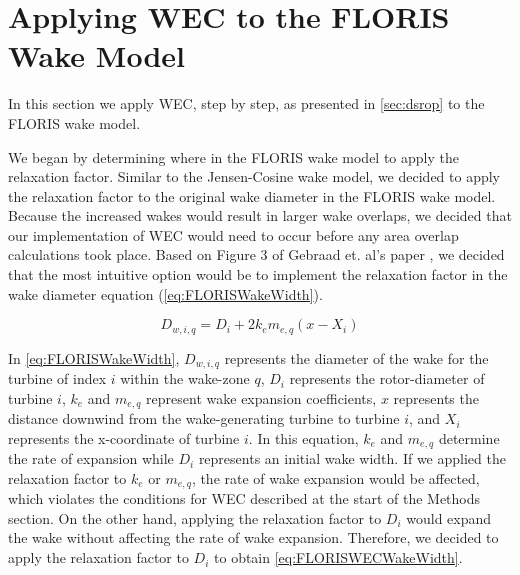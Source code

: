 \documentclass[a4paper]{jpconf}
\begin{document}
\section{Applying WEC to the FLORIS Wake Model}
In this section we apply WEC, step by step, as presented in \cref{sec:dsrop} to the FLORIS wake model.  


We began by determining where in the FLORIS wake model to apply the relaxation factor. Similar to the Jensen-Cosine wake model, we decided to apply the relaxation factor to the original wake diameter in the FLORIS wake model. Because the increased wakes would result in larger wake overlaps, we decided that our implementation of WEC would need to occur before any area overlap calculations took place. Based on Figure 3 of Gebraad et. al's paper \cite{Gebraad2014}, we decided that the most intuitive option would be to implement the relaxation factor in the wake diameter equation (\cref{eq:FLORISWakeWidth}).

\begin{equation}
    D_{w,i,q} = D_i + 2k_em_{e,q}(x - X_i)
    \label{eq:FLORISWakeWidth}
\end{equation}

In \cref{eq:FLORISWakeWidth}, $D_{w,i,q}$ represents the diameter of the wake for the turbine of index $i$ within the wake-zone $q$, $D_i$ represents the rotor-diameter of turbine $i$, $k_e$ and $m_{e,q}$ represent wake expansion coefficients, $x$ represents the distance downwind from the wake-generating turbine to turbine $i$, and $X_i$ represents the x-coordinate of turbine $i$. In this equation, $k_e$ and $m_{e,q}$ determine the rate of expansion while $D_i$ represents an initial wake width. If we applied the relaxation factor to $k_e$ or $m_{e,q}$, the rate of wake expansion would be affected, which violates the conditions for WEC described at the start of the Methods section. On the other hand, applying the relaxation factor to $D_i$ would expand the wake without affecting the rate of wake expansion. Therefore, we decided to apply the relaxation factor to $D_i$ to obtain \cref{eq:FLORISWECWakeWidth}.
\end{document}
